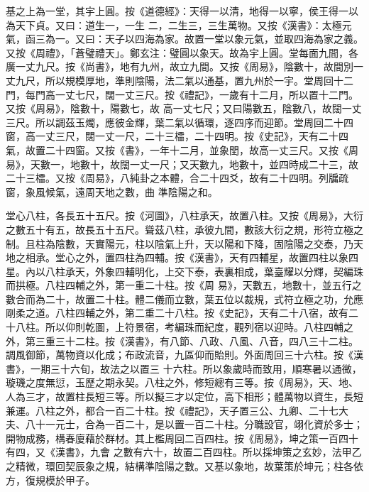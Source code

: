 \begin{pinyinscope}
 基之上為一堂，其宇上圓。按《道德經》：天得一以清，地得一以寧，侯王得一以為天下貞。又曰：道生一，一生
 二，二生三，三生萬物。又按《漢書》：太極元氣，函三為一。又曰：天子以四海為家。故置一堂以象元氣，並取四海為家之義。又按《周禮》，「蒼璧禮天」。鄭玄注：璧圓以象天。故為宇上圓。堂每面九間，各廣一丈九尺。按《尚書》，地有九州，故立九間。又按《周易》，陰數十，故間別一丈九尺，所以規模厚地，準則陰陽，法二氣以通基，置九州於一宇。堂周回十二門，每門高一丈七尺，闊一丈三尺。按《禮記》，一歲有十二月，所以置十二門。又按《周易》，陰數十，陽數七，故
 高一丈七尺；又曰陽數五，陰數八，故闊一丈三尺。所以調茲玉燭，應彼金輝，葉二氣以循環，逐四序而迎節。堂周回二十四窗，高一丈三尺，闊一丈一尺，二十三櫺，二十四明。按《史記》，天有二十四氣，故置二十四窗。又按《書》，一年十二月，並象閏，故高一丈三尺。又按《周易》，天數一，地數十，故闊一丈一尺；又天數九，地數十，並四時成二十三，故二十三櫺。又按《周易》，八純卦之本體，合二十四爻，故有二十四明。列牖疏窗，象風候氣，遠周天地之數，曲
 準陰陽之和。



 堂心八柱，各長五十五尺。按《河圖》，八柱承天，故置八柱。又按《周易》，大衍之數五十有五，故長五十五尺。聳茲八柱，承彼九間，數該大衍之規，形符立極之制。且柱為陰數，天實陽元，柱以陰氣上升，天以陽和下降，固陰陽之交泰，乃天地之相承。堂心之外，置四柱為四輔。按《漢書》，天有四輔星，故置四柱以象四星。內以八柱承天，外象四輔明化，上交下泰，表裏相成，葉臺耀以分輝，契編珠而拱極。八柱四輔之外，第一重二十柱。按《周
 易》，天數五，地數十，並五行之數合而為二十，故置二十柱。體二儀而立數，葉五位以裁規，式符立極之功，允應剛柔之道。八柱四輔之外，第二重二十八柱。按《史記》，天有二十八宿，故有二十八柱。所以仰則乾圖，上符景宿，考編珠而紀度，觀列宿以迎時。八柱四輔之外，第三重三十二柱。按《漢書》，有八節、八政、八風、八音，四八三十二柱。調風御節，萬物資以化成；布政流音，九區仰而貽則。外面周回三十六柱。按《漢書》，一期三十六旬，故法之以置三
 十六柱。所以象歲時而致用，順寒暑以通微，璇璣之度無愆，玉歷之期永契。八柱之外，修短總有三等。按《周易》，天、地、人為三才，故置柱長短三等。所以擬三才以定位，高下相形；體萬物以資生，長短兼運。八柱之外，都合一百二十柱。按《禮記》，天子置三公、九卿、二十七大夫、八十一元士，合為一百二十，是以置一百二十柱。分職設官，翊化資於多士；開物成務，構春廈藉於群材。其上檻周回二百四柱。按《周易》，坤之策一百四十有四，又《漢書》，九會
 之數有六十，故置二百四柱。所以採坤策之玄妙，法甲乙之精微，環回契辰象之規，結構準陰陽之數。又基以象地，故葉策於坤元；柱各依方，復規模於甲子。




\end{pinyinscope}
